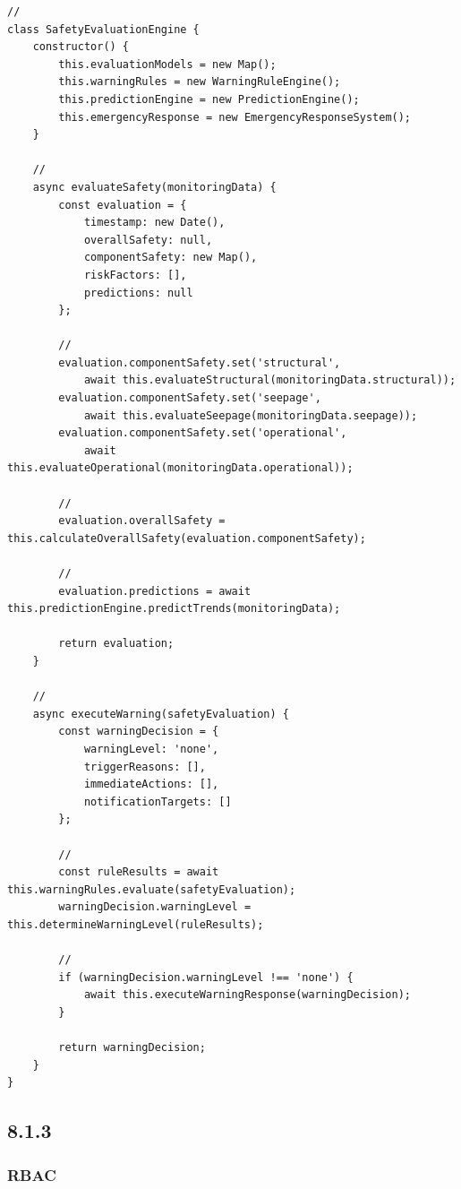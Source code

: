 \begin{verbatim}
// 
class SafetyEvaluationEngine {
    constructor() {
        this.evaluationModels = new Map();
        this.warningRules = new WarningRuleEngine();
        this.predictionEngine = new PredictionEngine();
        this.emergencyResponse = new EmergencyResponseSystem();
    }
    
    // 
    async evaluateSafety(monitoringData) {
        const evaluation = {
            timestamp: new Date(),
            overallSafety: null,
            componentSafety: new Map(),
            riskFactors: [],
            predictions: null
        };
        
        // 
        evaluation.componentSafety.set('structural', 
            await this.evaluateStructural(monitoringData.structural));
        evaluation.componentSafety.set('seepage', 
            await this.evaluateSeepage(monitoringData.seepage));
        evaluation.componentSafety.set('operational', 
            await this.evaluateOperational(monitoringData.operational));
        
        // 
        evaluation.overallSafety = this.calculateOverallSafety(evaluation.componentSafety);
        
        // 
        evaluation.predictions = await this.predictionEngine.predictTrends(monitoringData);
        
        return evaluation;
    }
    
    // 
    async executeWarning(safetyEvaluation) {
        const warningDecision = {
            warningLevel: 'none',
            triggerReasons: [],
            immediateActions: [],
            notificationTargets: []
        };
        
        // 
        const ruleResults = await this.warningRules.evaluate(safetyEvaluation);
        warningDecision.warningLevel = this.determineWarningLevel(ruleResults);
        
        // 
        if (warningDecision.warningLevel !== 'none') {
            await this.executeWarningResponse(warningDecision);
        }
        
        return warningDecision;
    }
}
\end{verbatim}

\subsection{8.1.3}\label{section-13}

\subsubsection{RBAC}\label{rbac}

